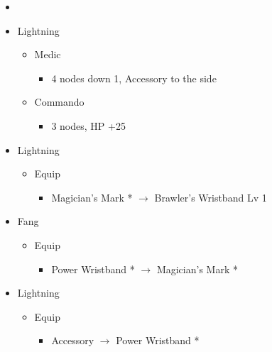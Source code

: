\documentclass{report}
\begin{document}
\begin{menu}
\begin{itemize}
    \paradigm
    \begin{itemize}
        \item {}%
{\paradigmline{\com}{\com}{\rav}}%
{\paradigmline{\rav}{\com}{\rav}}%
{\paradigmline{(\com)}{(\com)}{\rav}}%
{\paradigmline{(\com)}{(\com)}{(\med)}}%
{\paradigmline{\textit{(\com)}}{\textit{(\com)}}{\textit{\syn}}}%
{\paradigmline{(\com)}{\com}{(\med)}}
    \end{itemize}
    \crystarium
    \begin{itemize}
        \item Lightning
        \begin{itemize}
            \item Medic
            \begin{itemize}
                \item 4 nodes down 1, Accessory to the side
            \end{itemize}
            \item Commando
            \begin{itemize}
                \item 3 nodes, HP +25
            \end{itemize}
        \end{itemize}
    \end{itemize}
    \equip
    \begin{itemize}
        \item Lightning
        \begin{itemize}
            \item Equip
            \begin{itemize}
                \item Magician's Mark * $\rightarrow$ Brawler's Wristband Lv 1
            \end{itemize}
        \end{itemize}
        \item Fang
        \begin{itemize}
            \item Equip
            \begin{itemize}
                \item Power Wristband * $\rightarrow$ Magician's Mark *
            \end{itemize}
        \end{itemize}
        \item Lightning
        \begin{itemize}
            \item Equip
            \begin{itemize}
                \item Accessory $\rightarrow$ Power Wristband *
            \end{itemize}
        \end{itemize}
    \end{itemize}
\end{itemize}
\end{menu}
\end{document}
